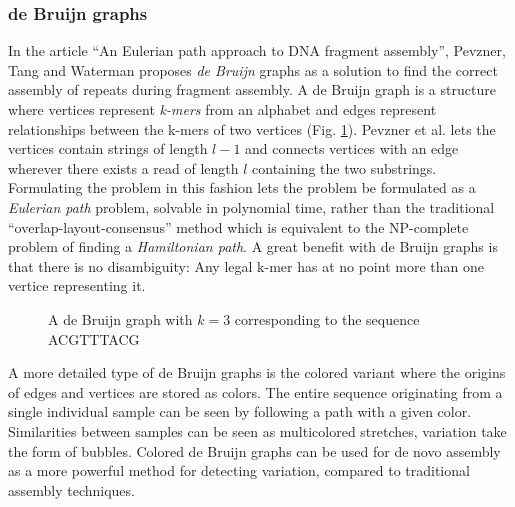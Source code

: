 \documentclass[thesis.tex]{subfiles}
\begin{document}
\subsubsection{de Bruijn graphs}
In the article ``An Eulerian path approach to DNA fragment assembly''\cite{an_eulerian_path_approach_to_dna_fragment_assembly}, Pevzner, Tang and Waterman proposes \textit{de Bruijn} graphs as a solution to find the correct assembly of repeats during fragment assembly. A de Bruijn graph is a structure where vertices represent \textit{k-mers} from an alphabet and edges represent relationships between the k-mers of two vertices (Fig. \ref{fig:de_bruijn_graph}). Pevzner et al. lets the vertices contain strings of length $l-1$ and connects vertices with an edge wherever there exists a read of length $l$ containing the two substrings. Formulating the problem in this fashion lets the problem be formulated as a \textit{Eulerian path} problem, solvable in polynomial time, rather than the traditional ``overlap-layout-consensus'' method which is equivalent to the NP-complete problem of finding a \textit{Hamiltonian path}. A great benefit with de Bruijn graphs is that there is no disambiguity: Any legal k-mer has at no point more than one vertice representing it.
\clearpage
\begin{figure}
    \begin{mdframed}
      \begin{center}
      \end{center}
    \end{mdframed}
  \caption{A de Bruijn graph with $k=3$ corresponding to the sequence ACGTTTACG}
  \label{fig:de_bruijn_graph}
\end{figure}
\par\noindent
A more detailed type of de Bruijn graphs is the colored variant where the origins of edges and vertices are stored as colors. The entire sequence originating from a single individual sample can be seen by following a path with a given color. Similarities between samples can be seen as multicolored stretches, variation take the form of bubbles. Colored de Bruijn graphs can be used for de novo assembly as a more powerful method for detecting variation, compared to traditional assembly techniques\cite{de_novo_assembly_and_genotyping_of_variants_using_colored_de_bruijn_graphs}.
\end{document}
